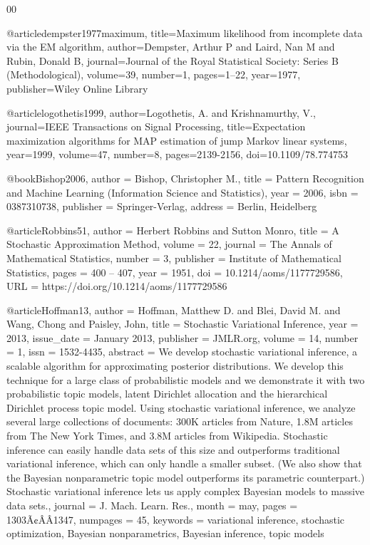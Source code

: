 \documentclass[preprint,12pt]{elsarticle}
\begin{document}
\begin{thebibliography}{00}
{@article{dempster1977maximum,
  title={Maximum likelihood from incomplete data via the EM algorithm},
  author={Dempster, Arthur P and Laird, Nan M and Rubin, Donald B},
  journal={Journal of the Royal Statistical Society: Series B (Methodological)},
  volume={39},
  number={1},
  pages={1--22},
  year={1977},
  publisher={Wiley Online Library}
}

@article{logothetis1999,
  author={Logothetis, A. and Krishnamurthy, V.},
  journal={IEEE Transactions on Signal Processing}, 
  title={Expectation maximization algorithms for MAP estimation of jump Markov linear systems}, 
  year={1999},
  volume={47},
  number={8},
  pages={2139-2156},
  doi={10.1109/78.774753}}
  
@book{Bishop2006,
author = {Bishop, Christopher M.},
title = {Pattern Recognition and Machine Learning (Information Science and Statistics)},
year = {2006},
isbn = {0387310738},
publisher = {Springer-Verlag},
address = {Berlin, Heidelberg}
}  

@article{Robbins51,
author = {Herbert Robbins and Sutton Monro},
title = {{A Stochastic Approximation Method}},
volume = {22},
journal = {The Annals of Mathematical Statistics},
number = {3},
publisher = {Institute of Mathematical Statistics},
pages = {400 -- 407},
year = {1951},
doi = {10.1214/aoms/1177729586},
URL = {https://doi.org/10.1214/aoms/1177729586}
}


@article{Hoffman13,
author = {Hoffman, Matthew D. and Blei, David M. and Wang, Chong and Paisley, John},
title = {Stochastic Variational Inference},
year = {2013},
issue_date = {January 2013},
publisher = {JMLR.org},
volume = {14},
number = {1},
issn = {1532-4435},
abstract = {We develop stochastic variational inference, a scalable algorithm for approximating posterior distributions. We develop this technique for a large class of probabilistic models and we demonstrate it with two probabilistic topic models, latent Dirichlet allocation and the hierarchical Dirichlet process topic model. Using stochastic variational inference, we analyze several large collections of documents: 300K articles from Nature, 1.8M articles from The New York Times, and 3.8M articles from Wikipedia. Stochastic inference can easily handle data sets of this size and outperforms traditional variational inference, which can only handle a smaller subset. (We also show that the Bayesian nonparametric topic model outperforms its parametric counterpart.) Stochastic variational inference lets us apply complex Bayesian models to massive data sets.},
journal = {J. Mach. Learn. Res.},
month = {may},
pages = {1303Ã¢ÂÂ1347},
numpages = {45},
keywords = {variational inference, stochastic optimization, Bayesian nonparametrics, Bayesian inference, topic models}
}

}
\end{thebibliography}
\end{document}
